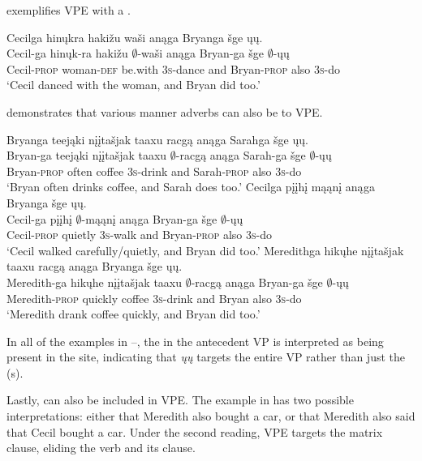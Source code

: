 \documentclass[output=paper]{LSP/langsci}
\begin{document}
 exemplifies VPE with a .
 
\ea\label{ex:johnson:9} 
\glll Cecilga {\ob}{\sVP} hinųkra hakižu waši{\cb} anąga Bryanga šge {\ob}ųų{\cb}.\\
Cecil-ga {} hinųk-ra hakižu $\emptyset$-waši anąga Bryan-ga šge $\emptyset$-ųų\\
Cecil-\textsc{prop} {} woman-\textsc{def} be.with \textsc{3s}-dance and Bryan-\textsc{prop} also \textsc{3s}-do\\
\trans `Cecil danced with the woman, and Bryan did too.'
\z

 demonstrates that various manner adverbs can also be  to VPE.
 
\ea\label{ex:johnson:10}
\ea 
\glll Bryanga  {\ob}{\sVP} teejąki {nįįtašjak taaxu} racgą{\cb} anąga Sarahga šge {\ob}ųų{\cb}.\\ 
Bryan-ga {} teejąki {nįįtašjak taaxu} $\emptyset$-racgą anąga Sarah-ga šge $\emptyset$-ųų\\
Bryan-\textsc{prop} {} often coffee \textsc{3s}-drink and Sarah-\textsc{prop} also \textsc{3s}-do\\
\trans `Bryan often drinks coffee, and Sarah does too.'
\ex 
\glll Cecilga  {\ob}{\sVP} pįįhį mąąnį{\cb} anąga Bryanga šge {\ob}ųų{\cb}.\\
Cecil-ga {} pįįhį $\emptyset$-mąąnį anąga Bryan-ga šge $\emptyset$-ųų\\
Cecil-\textsc{prop} {} quietly \textsc{3s}-walk and Bryan-\textsc{prop} also \textsc{3s}-do\\
\trans `Cecil walked carefully/quietly, and Bryan did too.'
\ex 
\glll Meredithga {\ob}{\sVP} hikųhe {nįįtašjak taaxu} racgą{\cb} anąga Bryanga šge {\ob}ųų{\cb}.\\
Meredith-ga {} hikųhe {nįįtašjak taaxu} $\emptyset$-racgą anąga Bryan-ga šge $\emptyset$-ųų\\
Meredith-\textsc{prop} {} quickly coffee \textsc{3s}-drink and Bryan also \textsc{3s}-do\\
\trans `Meredith drank coffee quickly, and Bryan did too.'
\z
\z

In all of the examples in --, the  in the antecedent VP is interpreted as being present in the  site, indicating that \emph{ųų} targets the entire VP rather than just the (s).

Lastly,   can also be included in VPE. The example in  has two possible interpretations: either that Meredith also bought a car, or that Meredith also said that Cecil bought a car. Under the second reading, VPE targets the matrix clause, eliding the verb and its  clause.
 
\end{document}
